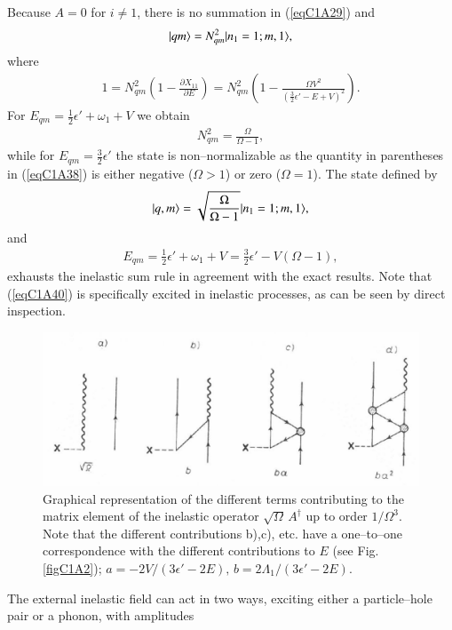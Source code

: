 Because $A=0$ for $i\neq 1$, there is no summation in (\ref{eqC1A29}) and
 \begin{align}\label{eqC1A37} 
|{qm} \rangle=N^2_{qm}|{n_1=1;m,1} \rangle,
 \end{align}
where
 \begin{align}\label{eqC1A38} 
1=N^2_{qm}\left(1-\frac{\partial X_{11}}{\partial E}\right)=N^2_{qm}\left(1-\frac{\Omega V^2}{\left(\frac{3}{2}\epsilon'-E+V\right)^2}\right).
 \end{align}
For $E_{qm}=\frac{1}{2}\epsilon'+\omega_1+V$ we obtain
 \begin{align}\label{eqC1A39} 
 N^2_{qm}=\frac{\Omega}{\Omega-1},
 \end{align}
while for $E_{qm}=\frac{3}{2}\epsilon'$ the state is non--normalizable as the quantity in parentheses
in (\ref{eqC1A38}) is either negative ($\Omega>1$) or zero ($\Omega=1$).
The state defined by
 \begin{align}\label{eqC1A40} 
|{q,m} \rangle=\sqrt{\frac{\Omega}{\Omega-1}}|{n_1=1;m,1} \rangle,
 \end{align}
and 
 \begin{align}\label{eqC1A41} 
E_{qm}=\frac{1}{2}\epsilon'+\omega_1+V=\frac{3}{2}\epsilon'-V(\Omega-1),
 \end{align}
exhausts the inelastic sum rule in agreement with the exact results. Note
that (\ref{eqC1A40}) is specifically excited in inelastic processes, as can be seen by
direct inspection.
  \begin{figure}
  \centerline {
  \includegraphics*[width=12cm]{introduccion/figs/fig20}
  }
  \caption{Graphical representation of the different terms contributing to the matrix element of the inelastic operator $\sqrt{\Omega}\,A^\dagger$ up to order $1/\Omega^3$. Note that the different contributions b),c), etc. have a one--to--one correspondence with the different contributions to $E$ (see Fig. \ref{figC1A2}); $a=-2V/(3\epsilon'-2E),\,b=2\Lambda_1/(3\epsilon'-2E)$.}
  \label{figC1A3}
  \end{figure}
The external inelastic field can act in two ways, exciting either a particle--hole pair or a phonon, with amplitudes 
